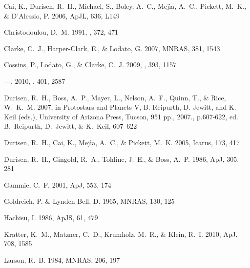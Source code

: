 \documentclass[manuscript]{aastex}
\begin{document}
\begin{thebibliography}{66}
{Cai}, K., {Durisen}, R.~H., {Michael}, S., {Boley}, A.~C., {Mej{\'{\i}}a},
  A.~C., {Pickett}, M.~K., \& {D'Alessio}, P. 2006, ApJL, 636, L149

{Christodoulou}, D.~M. 1991, \apj, 372, 471

{Clarke}, C.~J., {Harper-Clark}, E., \& {Lodato}, G. 2007, MNRAS, 381, 1543

{Cossins}, P., {Lodato}, G., \& {Clarke}, C.~J. 2009, \mnras, 393, 1157

---. 2010, \mnras, 401, 2587

{Durisen}, R.~H., {Boss}, A.~P., {Mayer}, L., {Nelson}, A.~F., {Quinn}, T., \&
  {Rice}, W.~K.~M. 2007, in Protostars and Planets V, B. Reipurth, D. Jewitt,
  and K. Keil (eds.), University of Arizona Press, Tucson, 951 pp., 2007.,
  p.607-622, ed. B.~{Reipurth}, D.~{Jewitt}, \& K.~{Keil}, 607--622

{Durisen}, R.~H., {Cai}, K., {Mej{\'{\i}}a}, A.~C., \& {Pickett}, M.~K. 2005,
  Icarus, 173, 417

{Durisen}, R.~H., {Gingold}, R.~A., {Tohline}, J.~E., \& {Boss}, A.~P. 1986,
  ApJ, 305, 281

{Gammie}, C.~F. 2001, ApJ, 553, 174

{Goldreich}, P. \& {Lynden-Bell}, D. 1965, MNRAS, 130, 125

{Hachisu}, I. 1986, ApJS, 61, 479

{Kratter}, K.~M., {Matzner}, C.~D., {Krumholz}, M.~R., \& {Klein}, R.~I. 2010,
  ApJ, 708, 1585

{Larson}, R.~B. 1984, MNRAS, 206, 197


\end{thebibliography}
\end{document}
